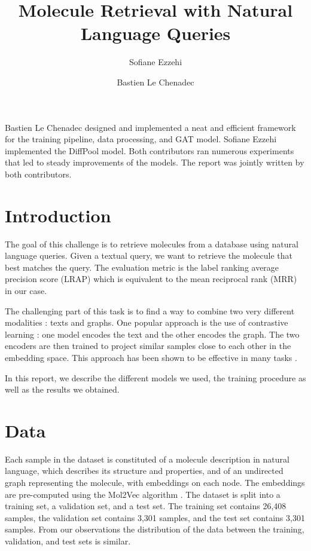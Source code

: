 \documentclass[switch, 11pt]{article}
\title{Molecule Retrieval with Natural Language Queries}
\author[1]{Sofiane Ezzehi}
\author[1]{Bastien Le Chenadec}
\affil[1]{École des Ponts ParisTech}
\begin{document}
\maketitle

\begin{contribstatement}
    Bastien Le Chenadec designed and implemented a neat and efficient framework for the training pipeline, data processing, and GAT model. Sofiane Ezzehi implemented the DiffPool model. Both contributors ran numerous experiments that led to steady improvements of the models. The report was jointly written by both contributors.
\end{contribstatement}

\begin{multicols}{2}
    \section{Introduction}

    The goal of this challenge is to retrieve molecules from a database using natural language queries. Given a textual query, we want to retrieve the molecule that best matches the query. The evaluation metric is the label ranking average precision score (LRAP) which is equivalent to the mean reciprocal rank (MRR) in our case.

    The challenging part of this task is to find a way to combine two very different modalities : texts and graphs. One popular approach is the use of contrastive learning : one model encodes the text and the other encodes the graph. The two encoders are then trained to project similar samples close to each other in the embedding space. This approach has been shown to be effective in many tasks \cite{chen-2020,gao-2021}.

    In this report, we describe the different models we used, the training procedure as well as the results we obtained.

    \section{Data}

    Each sample in the dataset is constituted of a molecule description in natural language, which describes its structure and properties, and of an undirected graph representing the molecule, with embeddings on each node. The embeddings are pre-computed using the Mol2Vec algorithm \cite{mol2vec}. The dataset is split into a training set, a validation set, and a test set. The training set contains 26,408 samples, the validation set contains 3,301 samples, and the test set contains 3,301 samples. From our observations the distribution of the data between the training, validation, and test sets is similar.


\end{multicols}
\end{document}
